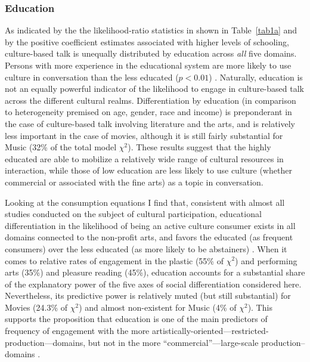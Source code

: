 \documentclass[11pt]{article}
\begin{document}
\subsubsection{Education}
As indicated by the the likelihood-ratio statistics in shown in Table~\ref{tab1a} and by the positive coefficient estimates associated with higher levels of schooling, culture-based talk is unequally distributed by education across \emph{all} five domains.  Persons with more experience in the educational system are more likely to use culture in conversation than the less educated ($p<0.01$) \citep{collins75, dimaggio96}.   Naturally, education is not an equally powerful indicator of the likelihood to engage in culture-based talk across the different cultural realms.  Differentiation by education (in comparison to heterogeneity premised on age, gender, race and income) is preponderant in the case of culture-based talk involving literature and the arts, and is relatively less important in the case of movies, although it is still fairly substantial for Music (32\% of the total model $\chi^{2}$).  These results suggest that the highly educated are able to mobilize a relatively wide range of cultural resources in interaction, while those of low education are less likely to use culture (whether commercial or associated with the fine arts) as a topic in conversation. 

Looking at the consumption equations I find that, consistent with almost all studies conducted on the subject of cultural participation, educational differentiation in the likelihood of being an active culture consumer exists in all domains connected to the non-profit arts, and favors the educated (as frequent consumers) over the less educated (as more likely to be abstainers) \citep{baumol_bowen66, dimaggio_useem78a, bourdieu_darbel91}. When it comes to relative rates of engagement in the plastic (55\% of $\chi^{2}$) and performing arts (35\%) and pleasure reading (45\%), education accounts for a substantial share of the explanatory power of the five axes of social differentiation considered here.  Nevertheless, its predictive power is relatively muted (but still substantial) for Movies (24.3\% of $\chi^{2}$) and almost non-existent for Music (4\% of $\chi^{2}$).  This supports the proposition that education is one of the main predictors of frequency of engagement with the more artistically-oriented---restricted-production---domains, but not in the more ``commercial''---large-scale production--domains \citep{bourdieu93a, lizardo_skiles09}. 
\end{document}
